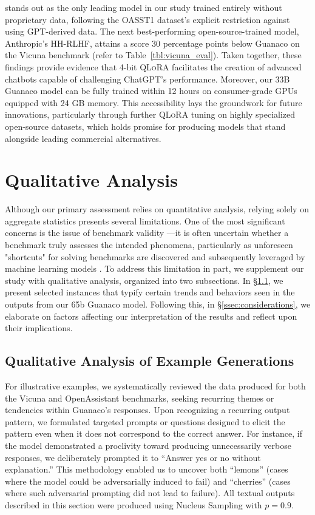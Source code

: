 stands out as the only leading model in our study trained entirely without proprietary data, following the OASST1 dataset's explicit restriction against using GPT-derived data. The next best-performing open-source-trained model, Anthropic’s HH-RLHF, attains a score 30 percentage points below {Guanaco} on the Vicuna benchmark (refer to Table~\ref{tbl:vicuna_eval}). Taken together, these findings provide evidence that 4-bit \textsc{QLoRA} facilitates the creation of advanced chatbots capable of challenging ChatGPT's performance. Moreover, our 33B {Guanaco} model can be fully trained within 12 hours on consumer-grade GPUs equipped with 24 GB memory. This accessibility lays the groundwork for future innovations, particularly through further \textsc{QLoRA} tuning on highly specialized open-source datasets, which holds promise for producing models that stand alongside leading commercial alternatives.

\section{Qualitative Analysis}

Although our primary assessment relies on quantitative analysis, relying solely on aggregate statistics presents several limitations. One of the most significant concerns is the issue of benchmark validity \citep{liao2021we}—it is often uncertain whether a benchmark truly assesses the intended phenomena, particularly as unforeseen "shortcuts" for solving benchmarks are discovered and subsequently leveraged by machine learning models \citep{gururangan2018annotation, poliak2018hypothesis}. To address this limitation in part, we supplement our study with qualitative analysis, organized into two subsections. In \S\ref{ssec:examples}, we present selected instances that typify certain trends and behaviors seen in the outputs from our 65b {Guanaco} model. Following this, in \S\ref{ssec:considerations}, we elaborate on factors affecting our interpretation of the results and reflect upon their implications.

\subsection{Qualitative Analysis of Example Generations}
\label{ssec:examples}

For illustrative examples, we systematically reviewed the data produced for both the Vicuna and OpenAssistant benchmarks, seeking recurring themes or tendencies within {Guanaco}'s responses. Upon recognizing a recurring output pattern, we formulated targeted prompts or questions designed to elicit the pattern even when it does not correspond to the correct answer. For instance, if the model demonstrated a proclivity toward producing unnecessarily verbose responses, we deliberately prompted it to ``Answer yes or no without explanation.'' This methodology enabled us to uncover both “lemons” (cases where the model could be adversarially induced to fail) and “cherries” (cases where such adversarial prompting did not lead to failure). All textual outputs described in this section were produced using Nucleus Sampling \cite{holtzmancurious} with $p=0.9$.

